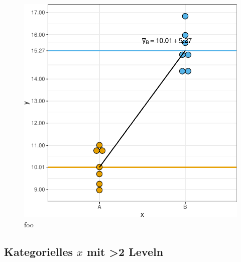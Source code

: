 \documentclass[
  letterpaper,
]{scrbook}
\begin{document}
\begin{figure}

{\centering \includegraphics{./stat-modeling-basic_files/figure-pdf/fig-stat-modeling-basic-01-1.pdf}

}

\caption{\label{fig-stat-modeling-basic-01}foo}

\end{figure}

\hypertarget{sec-interpret-x-cat3}{%
\subsection{\texorpdfstring{Kategorielles \(x\) mit \textgreater2
Leveln}{Kategorielles x mit \textgreater2 Leveln}}\label{sec-interpret-x-cat3}}
\end{document}

